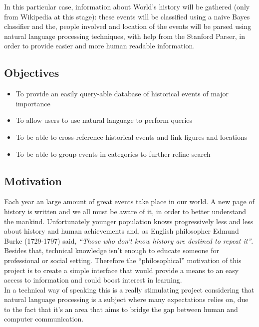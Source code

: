 \documentclass{llncs}
\begin{document}
In this particular case, information about World's history will be gathered (only from Wikipedia at this stage): these events will be classified using a naive Bayes classifier and the, people involved and location of the events will be parsed using natural language processing techniques, with help from the Stanford Parser\cite{sp}, in order to provide easier and more human readable information.\\

\subsection{Objectives}

\begin{itemize}
	\item To provide an easily query-able database of historical events of major importance
	\item To allow users to use natural language to perform queries
	\item To be able to cross-reference historical events and link figures and locations
	\item To be able to group events in categories to further refine search
\end{itemize}

\subsection{Motivation}

Each year an large amount of great events take place in our world. A new page of history is written and we all must be aware of it, in order to better understand the mankind. Unfortunately younger population knows progressively less and less about history and human achievements and, as English philosopher Edmund Burke (1729-1797) said, \textit{``Those who don't know history are destined to repeat it''}. Besides that, technical knowledge isn't enough to educate someone for professional or social setting.
Therefore the ``philosophical'' motivation of this project is to create a simple interface that would provide a means to an easy access to information and could boost interest in learning.\\

In a technical way of speaking this is a really stimulating project considering that natural language processing is a subject where many expectations relies on, due to the fact that it's an area that aims to bridge the gap between human and computer communication.
\end{document}
